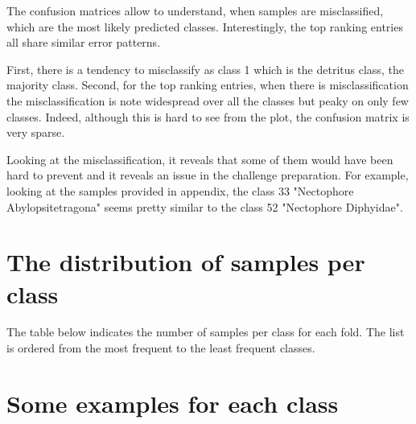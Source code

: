 \documentclass{article}
\begin{document}
The confusion matrices allow to understand, when samples are misclassified, which are the most likely predicted classes.  Interestingly, the top ranking entries all share similar error patterns.

First, there is a tendency to misclassify as class 1 which is the detritus class, the majority class. Second, for the top ranking entries, when there is misclassification the misclassification is note widespread over all the classes but peaky on only few classes. Indeed, although this is hard to see from the plot, the confusion matrix is very sparse. 

Looking at the misclassification, it reveals that some of them would have been hard to prevent and it reveals an issue in the challenge preparation. For example, looking at the samples provided in appendix, the class 33 "Nectophore Abylopsitetragona" seems pretty similar to the class 52 "Nectophore Diphyidae".



\appendix

\section*{The distribution of samples per class}

The table below indicates the number of samples per class for each fold. The list is ordered from the most frequent to the least frequent classes.



\pagebreak\newpage
\section*{Some examples for each class}


\end{document}
